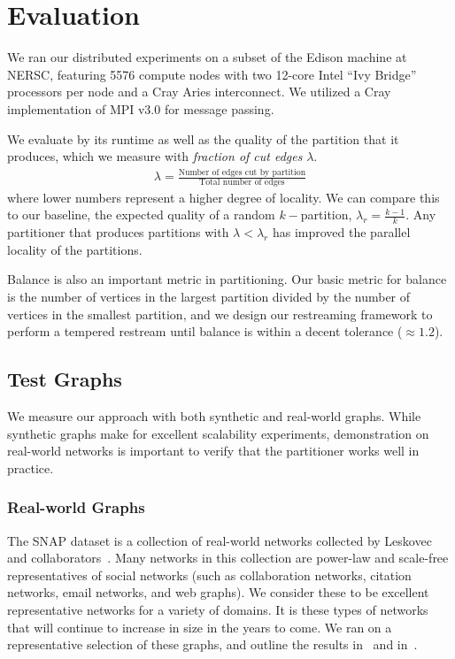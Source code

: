 \section{Evaluation}  \label{sec:eval}
We ran our distributed experiments on a subset of the Edison machine at NERSC, featuring 5576 compute nodes with two 12-core Intel ``Ivy Bridge'' processors per node and a Cray Aries interconnect. We utilized a Cray implementation of MPI v3.0 for message passing.

We evaluate \ourmethod by its runtime as well as the quality of the partition that it produces, which we measure with \textit{fraction of cut edges} $\lambda$.
\begin{align}\lambda = \frac{\text{Number of edges cut by partition}}{\text{Total number of edges}}\end{align} where lower numbers represent a higher degree of locality. We can compare this to our baseline, the expected quality of a random $k-$partition, $\lambda_r = \frac{k-1}{k}$. Any partitioner that produces partitions with $\lambda < \lambda_r$ has improved the parallel locality of the partitions.

Balance is also an important metric in partitioning. Our basic metric for balance is the number of vertices in the largest partition divided by the number of vertices in the smallest partition, and we design our restreaming framework to perform a tempered restream until balance is within a decent tolerance ($\approx 1.2$).

\subsection{Test Graphs}
We measure our approach with both synthetic and real-world graphs. While synthetic graphs make for excellent scalability experiments, demonstration on real-world networks is important to verify that the partitioner works well in practice. 

\subsubsection{Real-world Graphs}
The SNAP dataset is a collection of real-world networks collected by Leskovec and collaborators~\cite{Leskovec-data, snapnets}. 
Many networks in this collection are power-law and scale-free representatives of social networks (such as collaboration networks, citation networks, email networks, and web graphs). 
We consider these to be excellent representative networks for a variety of domains. It is these types of networks that will continue to increase in size in the years to come.
We ran \ourmethod on a representative selection of these graphs, and outline the results in~ and in~.

